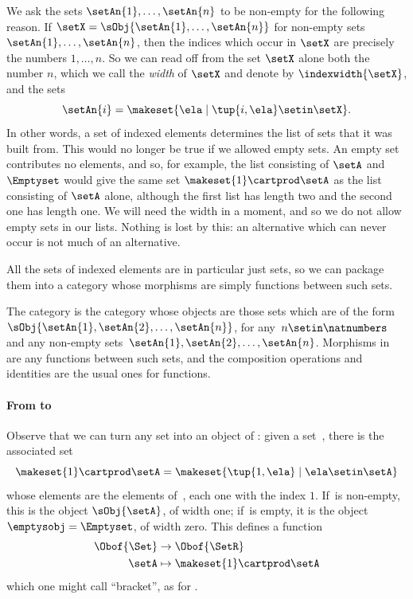 We ask the sets $\setAn{1}, \ldots, \setAn{n}$ to be non-empty for the following reason.
If $\setX = \sObj{\setAn{1}, \ldots, \setAn{n}}$ for non-empty sets $\setAn{1}, \ldots, \setAn{n}$, then the indices which occur in $\setX$ are precisely the numbers $1, \dots, n$.
So we can read off from the set $\setX$ alone both the number $n$, which we call the \emph{width} of $\setX$ and denote by $\indexwidth{\setX}$, and the sets
\begin{equation}
    \label{eq:indexed-elements-summands}
    \setAn{i} = \makeset{ \ela \mid \tup{i, \ela} \setin \setX }.
\end{equation}
In other words, a set of indexed elements determines the list of sets that it was built from.
This would no longer be true if we allowed empty sets.
An empty set contributes no elements, and so, for example, the list consisting of $\setA$ and $\Emptyset$ would give the same set $\makeset{1} \cartprod \setA$ as the list consisting of $\setA$ alone, although the first list has length two and the second one has length one.
We will need the width in a moment, and so we do not allow empty sets in our lists.
Nothing is lost by this: an alternative which can never occur is not much of an alternative.

All the sets of indexed elements are in particular just sets, so we can package them into a category whose morphisms are simply functions between such sets.

\begin{ctdefinition}[\SetR]\label{def:SetR}
    The category \SetR is the category whose objects are those sets which are of the form~$\sObj{\setAn{1}, \setAn{2}, \ldots, \setAn{n}}$, for any~$n \setin \natnumbers$ and any non-empty sets~$\setAn{1}, \setAn{2}, \ldots, \setAn{n}$.
    Morphisms in \SetR are any functions between such sets, and the composition operations and identities are the usual ones for functions.
\end{ctdefinition}

\paragraph{From \Set to~\SetR}

Observe that we can turn any set into an object of \SetR: given a set~\setA, there is the associated set
\begin{equation}
    \label{eq:setintosetr}
    \makeset{1} \cartprod \setA = \makeset{ \tup{1, \ela} \mid \ela \setin \setA }
\end{equation}
whose elements are the elements of~\setA, each one with the index $1$.
If~\setA is non-empty, this is the object $\sObj{\setA}$, of width one; if~\setA is empty, it is the object $\emptysobj = \Emptyset$, of width zero.
This defines a function
\begin{equation}
    \label{eq:setintosetrfunction}
    \begin{aligned}
        \Obof{\Set} & \to \Obof{\SetR} \\
        \setA       & \mapsto \makeset{1} \cartprod \setA
    \end{aligned}
\end{equation}
which one might call ``bracket'', as for \SetL.

